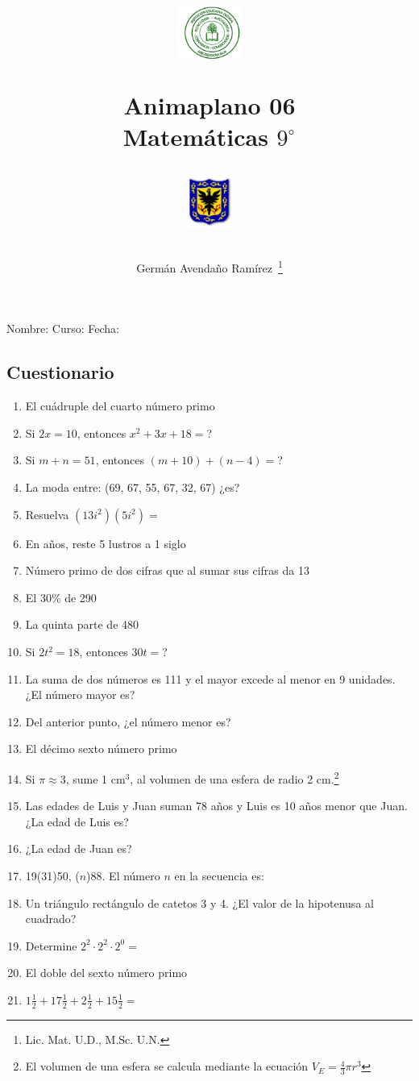 \documentclass[letterpaper,11pt,twoside]{article}
\author{Germ\'an Avenda\~no Ram\'irez~\thanks{Lic. Mat. U.D., M.Sc. U.N.}}
\title{\begin{minipage}{.2\textwidth}
\includegraphics[height=1.75cm]{Images/logo-colegio.png}\end{minipage}
\begin{minipage}{.55\textwidth}
\begin{center}
Animaplano 06\\
Matemáticas $9^{\circ}$
\end{center}
\end{minipage}\hfill
\begin{minipage}{.2\textwidth}
\includegraphics[height=1.75cm]{Images/logo-sed.png} 
\end{minipage}}
\date{}
\begin{document}
\maketitle
Nombre: \hrulefill Curso: \underline{\hspace*{44pt}} Fecha: \underline{\hspace*{2.5cm}}
\begin{multicols}{2}
\section*{Cuestionario}
\begin{enumerate}
\item El cuádruple del cuarto número primo
\item Si $2x=10$, entonces $x^{2}+3x+18=$?
\item Si $m+n=51$, entonces $(m+10)+(n-4)=$?
\item La moda entre: (69, 67, 55, 67, 32, 67) ¿es?
\item Resuelva $(13i^{2})(5i^{2})=$
\item En años, reste 5 lustros a 1 siglo
\item Número primo de dos cifras que al sumar sus cifras da 13
\item El 30\% de 290
\item La quinta parte de 480
\item Si $2t^{2}=18$, entonces $30t=$?
\item La suma de dos números es 111 y el mayor excede al menor en 9 unidades. ¿El número mayor es?
\item Del anterior punto, ¿el número menor es?
\item El décimo sexto número primo
\item Si $\pi \approx 3$, sume 1 cm$^{3}$, al volumen de una esfera de radio 2 cm.\footnote{El volumen de una esfera se calcula mediante la ecuación $V_{E}=\frac{4}{3}\pi r^{3}$}
\item Las edades de Luis y Juan suman 78 años y Luis es 10 años menor que Juan. ¿La edad de Luis es?
\item ¿La edad de Juan es?
\item 19(31)50, ($n$)88. El número $n$ en la secuencia es:
\item Un triángulo rectángulo de catetos 3 y 4. ¿El valor de la hipotenusa al cuadrado?
\item Determine $2^{2}\cdot 2^{2}\cdot 2^{0}=$
\item El doble del sexto número primo
\item $1\frac{1}{2}+17\frac{1}{2}+2\frac{1}{2}+15\frac{1}{2}=$

\end{enumerate}
\end{multicols}
\end{document}
